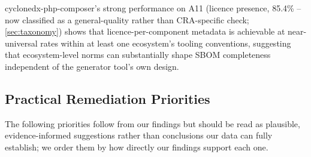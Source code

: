 \documentclass[11pt]{article}
\begin{document}
cyclonedx-php-composer's strong performance on A11 (licence presence, 85.4\% -- now classified as a general-quality rather than CRA-specific check; \cref{sec:taxonomy}) shows that licence-per-component metadata is achievable at near-universal rates within at least one ecosystem's tooling conventions, suggesting that ecosystem-level norms can substantially shape SBOM completeness independent of the generator tool's own design.

\subsection{Practical Remediation Priorities}

The following priorities follow from our findings but should be read as plausible, evidence-informed suggestions rather than conclusions our data can fully establish; we order them by how directly our findings support each one.
\end{document}
